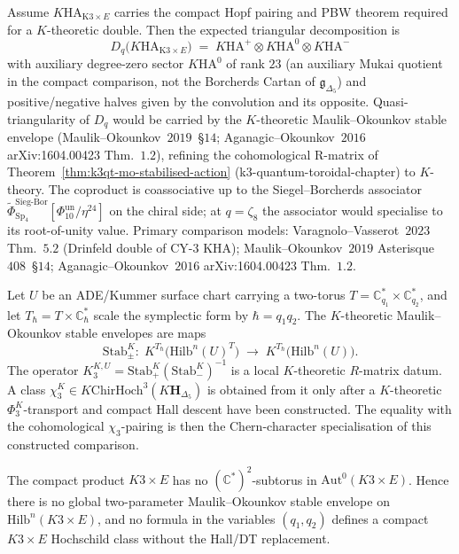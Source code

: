\begin{remark}
\label{rem:tcy3-kha-drinfeld-double}
Assume $K\mathrm{HA}_{\mathrm{K3}\times E}$ carries the compact Hopf
pairing and PBW theorem required for a $K$-theoretic double. Then the
expected triangular decomposition is
\[
 D_q\bigl( K\mathrm{HA}_{\mathrm{K3}\times E} \bigr)
 \;=\;
 K\mathrm{HA}^+ \otimes K\mathrm{HA}^0 \otimes K\mathrm{HA}^-
\]
with auxiliary degree-zero sector $K\mathrm{HA}^0$ of rank $23$ (an
auxiliary Mukai quotient in the compact comparison, not the
Borcherds Cartan of \(\mathfrak g_{\Delta_5}\)) and positive/negative halves given by
the convolution and its opposite. Quasi-triangularity of $D_q$ would be
carried by the $K$-theoretic Maulik--Okounkov stable envelope
(Maulik--Okounkov~$2019$~\S $14$; Aganagic--Okounkov~$2016$
arXiv:1604.00423 Thm.~$1.2$), refining the cohomological
R-matrix of Theorem~\ref{thm:k3qt-mo-stabilised-action}
(k3-quantum-toroidal-chapter) to $K$-theory. The coproduct is
coassociative up to the Siegel--Borcherds associator
$\widetilde{\Phi}^{\mathrm{Sieg\text{-}Bor}}_{\mathrm{Sp}_4}[\Phi_{10}^{\mathrm{un}}/\eta^{24}]$
on the chiral side; at $q = \zeta_8$ the associator would specialise to
its root-of-unity value. Primary comparison models:
Varagnolo--Vasserot~$2023$
Thm.~$5.2$ (Drinfeld double of CY-$3$ KHA); Maulik--Okounkov~$2019$
Asterisque~$408$~\S $14$; Aganagic--Okounkov~$2016$ arXiv:1604.00423
Thm.~$1.2$.
\end{remark}

\begin{proposition}
\label{thm:chi3-K-theoretic-lift-MO}
Let \(U\) be an ADE/Kummer surface chart carrying a two-torus
\(T=\mathbb C^*_{q_1}\times\mathbb C^*_{q_2}\), and let
\(T_\hbar=T\times\mathbb C^*_\hbar\) scale the symplectic form by
\(\hbar=q_1q_2\). The \(K\)-theoretic Maulik--Okounkov stable envelopes
are maps
\[
 \mathrm{Stab}^{K}_\pm :\;
 K^{T_\hbar}\bigl(\mathrm{Hilb}^n(U)^T\bigr)
 \;\longrightarrow\;
 K^{T_\hbar}\bigl(\mathrm{Hilb}^n(U)\bigr).
\]
The operator \(K^{K,U}_3=\mathrm{Stab}^{K}_+(\mathrm{Stab}^{K}_-)^{-1}\)
is a local \(K\)-theoretic \(R\)-matrix datum. A class
\(\chi^K_3\in K\mathrm{ChirHoch}^3(K\mathbf H_{\Delta_5})\) is obtained
from it only after a \(K\)-theoretic \(\Phi^K_3\)-transport and compact
Hall descent have been constructed. The equality with the
cohomological \(\chi_3\)-pairing is then the Chern-character
specialisation of this constructed comparison.

The compact product \(K3\times E\) has no
\((\mathbb C^*)^2\)-subtorus in \(\mathrm{Aut}^0(K3\times E)\). Hence
there is no global two-parameter Maulik--Okounkov stable envelope on
\(\mathrm{Hilb}^n(K3\times E)\), and no formula in the variables
\((q_1,q_2)\) defines a compact \(K3\times E\) Hochschild class without
the Hall/DT replacement.
\end{proposition}

